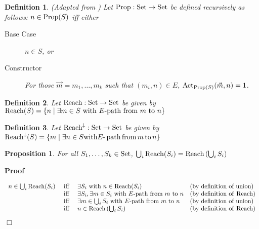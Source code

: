 \documentclass{article}
\newcommand{\infixiff}{\text{ iff }}
\newcommand{\tmop}[1]{\ensuremath{\operatorname{#1}}}
\newenvironment{proof}{\noindent\textbf{Proof\ }}{\hspace*{\fill}$\Box$\medskip}
\newtheorem{definition}{Definition}
\newtheorem{proposition}{Proposition}
\providecommand{\infixiff}{\mathbin{\text{ iff }}}
\newcommand{\Set}{\textsf{\tmop{Set}}}
\newcommand{\Reach}{\textsf{\tmop{Reach}}}
\newcommand{\Reachedby}{\textsf{\tmop{Reach}}^{\downarrow}}
\newcommand{\Prop}{\textsf{\tmop{Prop}}}
\newcommand{\Activ}{\textsf{\tmop{Act}}}
\begin{document}
\begin{definition}
  (Adapted from {\cite[Definition 3.4]{leitgeb2001nonmonotonic}}) Let $\Prop :
  \Set \rightarrow \Set$ be defined recursively as follows: $n \in \Prop (S)$
  iff either
  \begin{description}
    \item[Base Case] $n \in S$, or
    
    \item[Constructor] For those $\vec{m} = m_1, \ldots, m_k$ such that $(m_i,
    n) \in E$, $\Activ_{\Prop (S)} (\vec{m}, n) = 1$.
  \end{description}
\end{definition}

\begin{definition}
  Let $\Reach : \Set \rightarrow \Set$ be given by $\Reach (S) = \left\{ n
  \mid \exists m \in S \text{ with } E \text{-path from } m \text{ to } n
  \right\}$
\end{definition}

\begin{definition}
  Let $\Reachedby : \Set \rightarrow \Set$ be given by $\Reachedby (S) =
  \left\{ m \mid \text{} \exists n \in S \text{with} E \textrm{-} \tmop{path}
  \tmop{from} m \tmop{to} n \right\}$
\end{definition}

\begin{proposition}
  \label{reach-closed-under-intersection}For all $S_1, \ldots, S_k \in \Set$,
  $\bigcup_i \Reach (S_i) = \Reach \left( \bigcup_i S_i \right)$
\end{proposition}

\begin{proof}
  
  \[ \begin{array}{llll}
       n \in \bigcup_i \Reach (S_i) & \infixiff & \exists S_i \text{ with } n
       \in \Reach (S_i) & \text{} \text{(by definition of union)}\\
       & \infixiff & \exists S_i, \exists m \in S_i \text{ with $E$-path from
       } m \text{ to } n & \text{(by definition of {\Reach})}\\
       & \infixiff & \exists m \in \bigcup_i S_i \text{ with $E$-path from }
       m \text{ to } n & \text{(by definition of union)}\\
       & \infixiff & n \in \Reach \left( \bigcup_i S_i \right) & \text{(by
       definition of {\Reach})}
     \end{array} \]
  
\end{proof}
\end{document}
